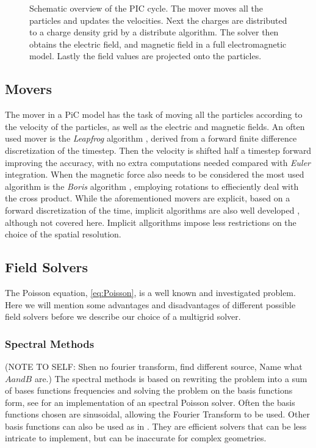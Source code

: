     \begin{figure}
        \center
        
        \caption{Schematic overview of the PIC cycle. The mover moves all the particles and updates the velocities.
        Next the charges are distributed to a charge density grid by a distribute algorithm. The solver then
        obtains the electric field, and magnetic field in a full electromagnetic model. Lastly the field values are
		projected onto the particles.}
        \label{fig:schematic}
    \end{figure}

	\subsection{Movers}
		The mover in a PiC model has the task of moving all the particles according to
		the velocity of the particles, as well as the electric and magnetic fields.
		An often used mover is the \textit{Leapfrog} algorithm \citep{birdsall_plasma_2004},
 		derived from a forward finite difference discretization of the timestep. Then the
 		velocity is shifted half a timestep forward improving the accuracy, with no extra computations needed compared
		with \textit{Euler} integration. When the magnetic force also needs to be considered
		the most used algorithm is the  \textit{Boris} algorithm \citep{qin_why_2013}, employing rotations to effieciently deal with
		the cross product.
		While the aforementioned movers are explicit, based on a forward discretization of the time,
 		implicit algorithms are also well developed \citep{friedman_direct_1981}, although not covered here.
 		Implicit allgorithms impose less restrictions on the choice of the spatial resolution.


    \subsection{Field Solvers}
	\label{sec:solvers}
    The Poisson equation, \cref{eq:Poisson}, is a well known and investigated problem.
    Here we will mention some advantages and disadvantages of different possible
    field solvers before we describe our choice of a multigrid solver.

    \subsubsection{Spectral Methods} (NOTE TO SELF: Shen no fourier transform, find different source, Name what \(A and B\) are.)
    	The spectral methods is based on rewriting the problem into a sum of bases functions
		frequencies and solving the problem on the basis functions form, see \citet{israeli_accurate_2005} for an
    	implementation of an spectral Poisson solver. Often the basis functions chosen are
 		sinusoidal, allowing the Fourier Transform to be used. Other basis functions can also be used as in
		\citet{shen_efficient_1994}. They are efficient solvers that
    	can be less intricate to implement, but can be inaccurate for complex geometries.

